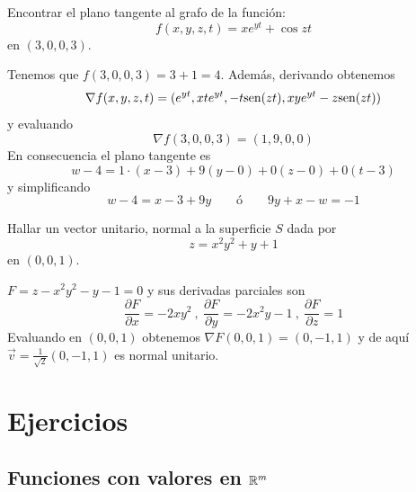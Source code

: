 \begin{ejemplo}
Encontrar el plano tangente al grafo de la funci\'on:
\[ f(x,y,z,t)=xe^{yt}+\cos zt \]
en $ (3,0,0,3)$.

\begin{solucion}
Tenemos  que $f(3,0,0,3)=3+1=4.  $ Adem\'as, derivando obtenemos
$$ \nabla f(x,y,z,t)=(e^{yt},xte^{yt},-t\text{sen}(zt),xye^{yt}-z\text{sen}(zt))$$ 
y evaluando
$$ \nabla f(3,0,0,3)=(1,9,0,0)$$ 
En consecuencia el plano tangente es
$$ w-4=1\cdot (x-3)+9(y-0)+0(z-0)+0(t-3) $$
y simplificando
$$ w-4=x-3+9y \qquad \text{\'o} \qquad 9y+x-w=-1 $$ 
\end{solucion}
\end{ejemplo}

\begin{ejemplo}
Hallar un vector unitario, normal a la superficie $ S $ dada por
\[ z=x^2y^2+y+1 \]
en $ (0,0,1) $.

\begin{solucion}
$ F=z-x^2y^2-y-1=0  $ y sus derivadas parciales son 
$$ \frac{\partial F}{\partial x}=-2xy^2 \:,\:
\frac{\partial F}{\partial y}=-2x^2y-1 \:,\:
\frac{\partial F}{\partial z}=1
$$
Evaluando en $(0,0,1)$ obtenemos $\nabla F(0,0,1)=(0,-1,1) $ y de aqu\'i
 $ \vec{v}=\frac{1}{\sqrt{2}}(0,-1,1) $ es normal unitario.
\end{solucion}
\end{ejemplo}

 

\section{Ejercicios}

\subsection*{Funciones con valores en \texorpdfstring{$\mathbb{R}^m$}{Rm}}


